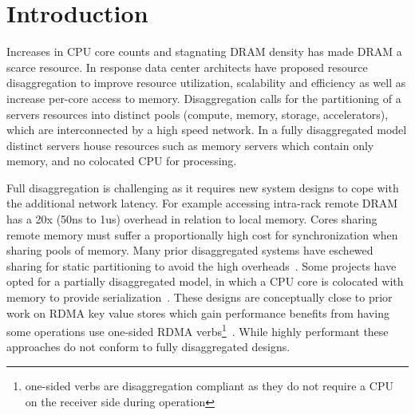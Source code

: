 \section{Introduction}
\label{sec:intro}

Increases in CPU core counts and stagnating DRAM density has
made DRAM a scarce resource. In response data center
architects have proposed resource disaggregation to improve
resource utilization, scalability and efficiency as well as
increase per-core access to memory. Disaggregation calls for
the partitioning of a servers resources into distinct pools
(compute, memory, storage, accelerators), which are
interconnected by a high speed network.  In a fully
disaggregated model distinct servers house resources such as
memory servers which contain only memory, and no colocated
CPU for processing.


Full disaggregation is challenging as it requires new system
designs to cope with the additional network latency.  For
example accessing intra-rack remote DRAM has a 20x (50ns to
1us) overhead in relation to local memory. Cores sharing
remote memory must suffer a proportionally high cost for
synchronization when sharing pools of memory. Many prior
disaggregated systems have eschewed sharing for static
partitioning to avoid the high overheads~\cite{
reigons,blade-server,legoos}.  Some projects have opted for
a partially disaggregated model, in which a CPU core is
colocated with memory to provide
serialization~\cite{clover}. These designs are conceptually
close to prior work on RDMA key value stores which gain
performance benefits from having some operations use
one-sided RDMA verbs\footnote{one-sided verbs are
disaggregation compliant as they do not require a CPU on the
receiver side during operation}~\cite{erpc,herd,pilaf,cell,clover}.
While highly performant these approaches do not conform to
fully disaggregated designs.


